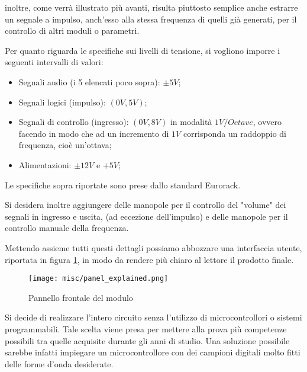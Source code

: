 inoltre, come verrà illustrato più avanti, risulta piuttosto semplice anche estrarre un
segnale a impulso, anch'esso alla stessa frequenza di quelli già generati, per il controllo
di altri moduli o parametri.
\smallskip

Per quanto riguarda le specifiche sui livelli di tensione, si vogliono imporre i seguenti
intervalli di valori:

\begin{itemize}
    \item Segnali audio (i 5 elencati poco sopra): $\pm5V$;
    \item Segnali logici (impulso): $(0V,5V)$;
    \item Segnali di controllo (ingresso): $(0V,8V)$ in modalità $1V/Octave$, ovvero
          facendo in modo che ad un incremento di $1V$ corrisponda un raddoppio di frequenza,
          cioè un'ottava;
    \item Alimentazioni: $\pm12V$ e $+5V$;
\end{itemize}

Le specifiche sopra riportate sono prese dallo standard Eurorack.

Si desidera inoltre aggiungere delle manopole per il controllo del "volume" dei segnali
in ingresso e uscita, (ad eccezione dell'impulso) e delle manopole per il controllo
manuale della frequenza.

Mettendo assieme tutti questi dettagli possiamo abbozzare una interfaccia utente,
riportata in figura \ref{panel_explained}, in modo da rendere più chiaro al lettore il
prodotto finale.
\medskip

\begin{figure}[ht]
    \centering
    \texttt{[image: misc/panel\_explained.png]}
    \caption{Pannello frontale del modulo}
    \label{panel_explained}
\end{figure}

Si decide di realizzare l'intero circuito senza l'utilizzo di microcontrollori o sistemi
programmabili. Tale scelta viene presa per mettere alla prova più competenze possibili tra
quelle acquisite durante gli anni di studio. Una soluzione possibile sarebbe infatti
impiegare un microcontrollore con dei campioni digitali molto fitti delle forme d'onda
desiderate.

